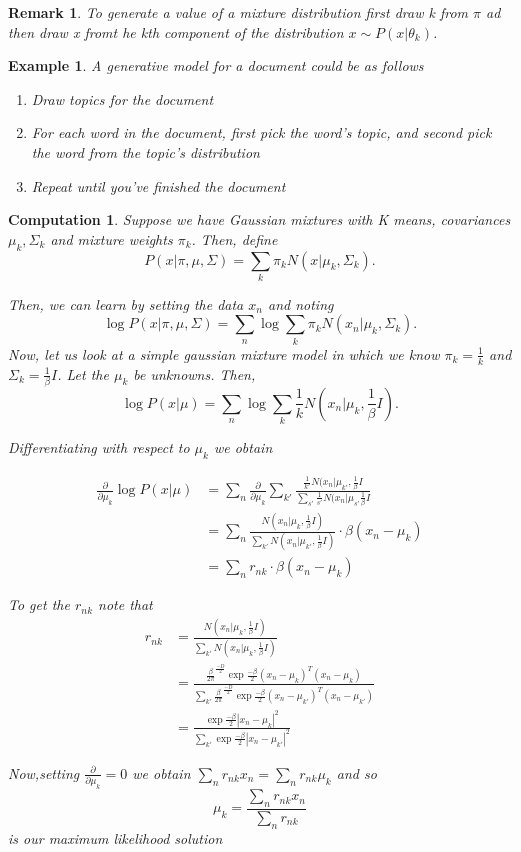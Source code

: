 \documentclass{amsart}
\newtheorem{comp}[subsubsection]{Computation}
\newtheorem{rem}[subsubsection]{Remark}
\newtheorem{eg}[subsection]{Example}
\begin{document}
\begin{rem}
To generate a value of a mixture distribution first draw k from $\pi$ ad then draw x fromt he kth component of the distribution $x \sim P(x|\theta_k)$.
\end{rem}

\begin{eg}
A generative model for a document could be as follows
\begin{enumerate}
\item Draw topics for the document
\item For each word in the document, first pick the word's topic, and second pick the word from the topic's distribution
\item Repeat until you've finished the document
\end{enumerate}
\end{eg}

\begin{comp}
Suppose we have Gaussian mixtures with K means, covariances $\mu_k,\Sigma_k$ and mixture weights $\pi_k$. Then, define
$$P(x|\pi,\mu,\Sigma) = \sum_k \pi_k N(x|\mu_k,\Sigma_k).$$

Then, we can learn by setting the data $x_n$ and noting
$$\log P(x|\pi,\mu,\Sigma) = \sum_n \log \sum_k \pi_k N(x_n|\mu_k,\Sigma_k).$$
Now, let us look at a simple gaussian mixture model in which we know $\pi_k = \frac{1}{k}$ and $\Sigma_k = \frac{1}{\beta}I$. Let the $\mu_k$ be unknowns. Then, 
$$\log P(x|\mu) = \sum_n \log \sum_k \frac{1}{k} N(x_n|\mu_k, \frac{1}{\beta}I).$$

Differentiating with respect to $\mu_k$ we obtain

\begin{align*}
	\frac{\partial}{\partial \mu_k}\log P(x|\mu) &= \sum_n \frac{\partial}{\partial \mu_k}\sum_{k'}\frac{\frac{1}{k'}N(x_n|\mu_{k'},\frac{1}{\beta}I}{\sum_{s'} \frac{1}{s'}N(x_n|\mu_{s'}\frac{1}{\beta}I}
	\\
	&= \sum_n \frac{N(x_n|\mu_k,\frac{1}{\beta}I)}{\sum_{k'} N(x_n|\mu_{k'},\frac{1}{\beta}I)}\cdot \beta(x_n-\mu_k)
	\\
	&= \sum_n r_{nk} \cdot \beta(x_n-\mu_k)
\end{align*}

To get the $r_{nk}$ note that
\begin{align*}
	r_{nk} &= \frac{N(x_n|\mu_k,\frac{1}{\beta}I)}{\sum_{k'}N(x_n|\mu_k,\frac{1}{\beta}I)}
	\\
	&=	\frac{\frac{\beta}{2\pi}^{\frac{-D}{2}}\exp{\frac{-\beta}{2}(x_n-\mu_k)^T(x_n-\mu_k)}}{\sum_{k'} \frac{\beta}{2\pi}^{\frac{-D}{2}}\exp{\frac{-\beta}{2}(x_n-\mu_{k'})^T(x_n-\mu_{k'})}}
	\\
	&= \frac{\exp{\frac{-\beta}{2}|x_n-\mu_k|^2}}{\sum_{k'}\exp{\frac{-\beta}{2}|x_n-\mu_{k'}|^2}}
\end{align*}

Now,setting $\frac{\partial}{\partial\mu_k}=0$ we obtain $\sum_n r_{nk}x_n = \sum_n r_{nk}\mu_k$ and so $$\mu_k = \frac{\sum_n r_{nk}x_n}{\sum_n r_{nk}}$$ is our maximum likelihood solution
\end{comp}
\end{document}
